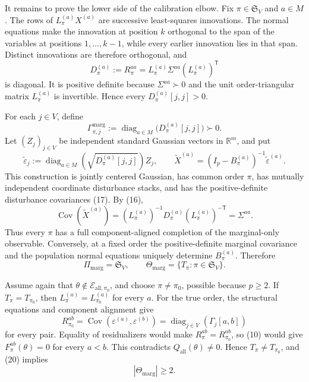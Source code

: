 It remains to prove the lower side of the calibration elbow.  Fix \(\pi\in\mathfrak S_V\) and \(a\in M\).  The rows of \(L_\pi^{(a)}X^{(a)}\) are successive least-squares innovations.  The normal equations make the innovation at position \(k\) orthogonal to the span of the variables at positions \(1,\ldots,k-1\), while every earlier innovation lies in that span.  Distinct innovations are therefore orthogonal, and
\[
D_\pi^{(a)}:=R_\pi^{aa}
=L_\pi^{(a)}\Sigma^{aa}(L_\pi^{(a)})^{\mathsf T}
\tag{16}
\]
is diagonal.  It is positive definite because \(\Sigma^{aa}\succ0\) and the unit order-triangular matrix \(L_\pi^{(a)}\) is invertible.  Hence every \(D_\pi^{(a)}[j,j]>0\).

For each \(j\in V\), define
\[
\Gamma_{\pi,j}^{\mathrm{marg}}
:=\operatorname{diag}_{a\in M}\bigl(D_\pi^{(a)}[j,j]\bigr)\succ0.
\tag{17}
\]
Let \((Z_j)_{j\in V}\) be independent standard Gaussian vectors in \(\mathbb R^m\), and put
\[
\widetilde\varepsilon_j
:=\operatorname{diag}_{a\in M}\!\left(\sqrt{D_\pi^{(a)}[j,j]}\right)Z_j,
\qquad
\widetilde X^{(a)}=(I_p-B_\pi^{(a)})^{-1}\widetilde\varepsilon^{(a)}.
\tag{18}
\]
This construction is jointly centered Gaussian, has common order \(\pi\), has mutually independent coordinate disturbance stacks, and has the positive-definite disturbance covariances (17).  By (16),
\[
\operatorname{Cov}(\widetilde X^{(a)})
=(L_\pi^{(a)})^{-1}D_\pi^{(a)}(L_\pi^{(a)})^{-\mathsf T}
=\Sigma^{aa}.
\tag{19}
\]
Thus every \(\pi\) has a full component-aligned completion of the marginal-only observable.  Conversely, at a fixed order the positive-definite marginal covariance and the population normal equations uniquely determine \(B_\pi^{(a)}\).  Therefore
\[
\Pi_{\mathrm{marg}}=\mathfrak S_V,
\qquad
\Theta_{\mathrm{marg}}=\{T_\pi:\pi\in\mathfrak S_V\}.
\tag{20}
\]

Assume again that \(\theta\notin\mathcal E_{\mathrm{all},\pi_0}\), and choose \(\pi\ne\pi_0\), possible because \(p\ge2\).  If \(T_\pi=T_{\pi_0}\), then \(L_\pi^{(a)}=L_{\pi_0}^{(a)}\) for every \(a\).  For the true order, the structural equations and component alignment give
\[
R_{\pi_0}^{ab}
=\operatorname{Cov}(\varepsilon^{(a)},\varepsilon^{(b)})
=\operatorname{diag}_{j\in V}(\Gamma_j[a,b])
\tag{21}
\]
for every pair.  Equality of residualizers would make \(R_\pi^{ab}=R_{\pi_0}^{ab}\), so (10) would give \(F_\pi^{ab}(\theta)=0\) for every \(a<b\).  This contradicts \(Q_{\mathrm{all}}(\theta)\ne0\).  Hence \(T_\pi\ne T_{\pi_0}\), and (20) implies
\[
|\Theta_{\mathrm{marg}}|\ge2.
\tag{22}
\]

